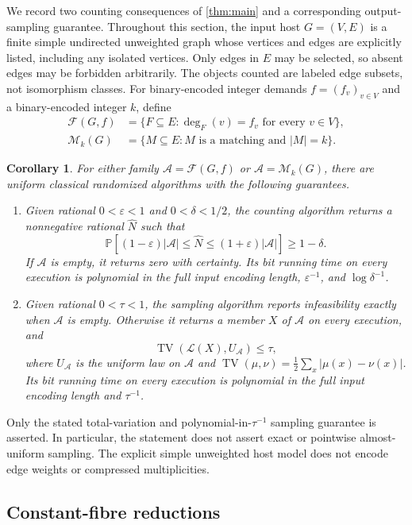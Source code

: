 \documentclass[11pt]{article}
\newtheorem{corollary}[theorem]{Corollary}
\theoremstyle{definition}
\theoremstyle{remark}
\newcommand{\Prb}{\mathbb P}
\DeclareMathOperator{\TV}{TV}
\newcommand{\eps}{\varepsilon}
\numberwithin{equation}{section}
\begin{document}
We record two counting consequences of \cref{thm:main} and a corresponding
output-sampling guarantee. Throughout this section, the input host
$G=(V,E)$ is a finite simple undirected unweighted graph whose vertices and
edges are explicitly listed, including any isolated vertices. Only edges
in $E$ may be selected, so absent edges may be forbidden arbitrarily.
The objects counted are labeled edge subsets, not isomorphism classes.
For binary-encoded integer demands $f=(f_v)_{v\in V}$ and a binary-encoded
integer $k$, define
\[
\begin{aligned}
 \mathcal F(G,f)&=\{F\subseteq E:\deg_F(v)=f_v\text{ for every }v\in V\},\\
 \mathcal M_k(G)&=\{M\subseteq E:M\text{ is a matching and }|M|=k\}.
\end{aligned}
\]

\begin{corollary}\label{cor:prescribed-degree}
For either family $\mathcal A=\mathcal F(G,f)$ or
$\mathcal A=\mathcal M_k(G)$, there are uniform classical randomized
algorithms with the following guarantees.
\begin{enumerate}[label=(\roman*)]
\item Given rational $0<\eps<1$ and $0<\delta<1/2$, the counting algorithm
returns a nonnegative rational $\widehat N$ such that
\[
 \Prb[(1-\eps)|\mathcal A|\le \widehat N\le(1+\eps)|\mathcal A|]
 \ge1-\delta.
\]
If $\mathcal A$ is empty, it returns zero with certainty. Its bit running
time on every execution is polynomial in the full input encoding length,
$\eps^{-1}$, and $\log\delta^{-1}$.
\item Given rational $0<\tau<1$, the sampling algorithm reports infeasibility
exactly when $\mathcal A$ is empty. Otherwise it returns a member $X$ of
$\mathcal A$ on every execution, and
\[
 \TV(\mathcal L(X),U_{\mathcal A})\le\tau,
\]
where $U_{\mathcal A}$ is the uniform law on $\mathcal A$ and
$\TV(\mu,\nu)=\frac12\sum_x|\mu(x)-\nu(x)|$. Its bit running time on every
execution is polynomial in the full input encoding length and $\tau^{-1}$.
\end{enumerate}
\end{corollary}

Only the stated total-variation and polynomial-in-$\tau^{-1}$ sampling
guarantee is asserted. In particular, the statement does not assert exact
or pointwise almost-uniform sampling. The explicit simple unweighted host
model does not encode edge weights or compressed multiplicities.

\subsection{Constant-fibre reductions}
\end{document}
